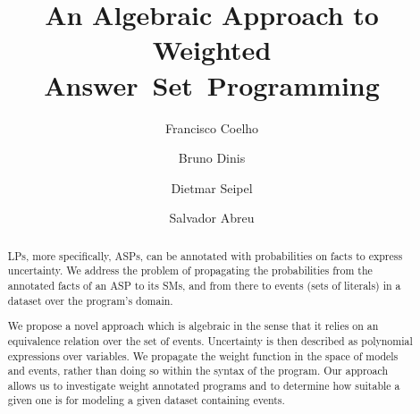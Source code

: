 \documentclass[x11names]{tlp}
\begin{document}

\title{%
	An Algebraic Approach to Weighted
	Answer~Set~Programming
}
\ifTLP

	\begin{authgrp}
		\author{ }

		\author{ }

		\author{ }

		\author{ }
	\end{authgrp}
\else
	\author{%
		Francisco Coelho   \and %
		Bruno Dinis        \and %
		Dietmar Seipel       \and %
		Salvador Abreu     %
	}
\fi

\maketitle

\begin{abstract}
	\Aclp{LP}, more specifically, \aclp*{ASP}, can be annotated with probabilities on facts to express uncertainty.
	We address the 	problem of propagating the probabilities from the annotated facts of an \acl*{ASP} to its \aclp*{SM}, and from there to events (sets of literals) in a dataset over the program's domain. %

	We propose a novel approach which is algebraic in the sense that it relies on an equivalence relation over the set of events.
	Uncertainty is then described as polynomial expressions over variables.
	We propagate the weight function in the space of models and events, rather than doing so within the syntax of the program.
	Our approach allows us to investigate weight annotated programs and to determine how suitable a given one is for modeling a given dataset containing events.
\end{abstract}
\end{document}
